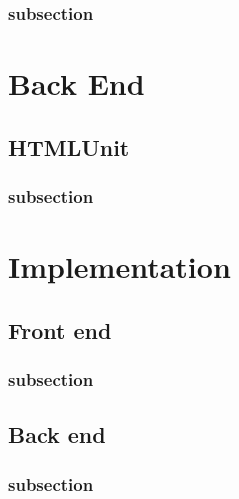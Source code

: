 \documentclass[a4paper,11pt]{kth-mag}
\begin{document}
\subsection{subsection}

\chapter{Back End}

\section{HTMLUnit}

\subsection{subsection}

\chapter{Implementation}

\section{Front end}

\subsection{subsection}

\section{Back end}
\label{backendimpl}

\subsection{subsection}
\end{document}
